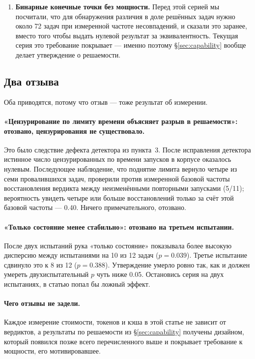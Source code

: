 \begin{enumerate}
\item \textbf{Бинарные конечные точки без мощности.} Перед этой серией мы
      посчитали, что для обнаружения различия в доле решённых задач нужно
      около 72 задач при измеренной частоте несовпадений, и сказали это
      заранее, вместо того чтобы выдать нулевой результат за
      эквивалентность. Текущая серия это требование покрывает — именно
      поэтому \S\ref{sec:capability} вообще делает утверждение о
      решаемости.
\end{enumerate}

\subsection{Два отзыва}

Оба приводятся, потому что отзыв — тоже результат об измерении.

\paragraph{«Цензурирование по лимиту времени объясняет разрыв в
решаемости»: отозвано, цензурирования не существовало.} Это было следствие
дефекта детектора из пункта~3. После исправления детектора истинное число
цензурированных по времени запусков в корпусе оказалось нулевым. Последующее
наблюдение, что поднятие лимита вернуло четыре из семи провалившихся задач,
проверили против измеренной базовой частоты восстановления вердикта между
неизменёнными повторными запусками (\num{5}/\num{11}); вероятность увидеть
четыре или больше восстановлений только за счёт этой базовой частоты —
\num{0.40}\live. Ничего примечательного, отозвано.

\paragraph{«Только состояние менее стабильно»: отозвано на третьем
испытании.} После двух испытаний рука «только состояние» показывала более
высокую дисперсию между испытаниями на 10 из 12 задач
($p={}$\num{0.039}). Третье испытание сдвинуло это к 8 из 12
($p={}$\num{0.388}). Утверждение умерло ровно так, как и должен умереть
двухиспытательный $p$ чуть ниже \num{0.05}. Остановись серия на двух
испытаниях, в статью попал бы ложный эффект.

\paragraph{Чего отзывы не задели.} Каждое измерение стоимости, токенов и
кэша в этой статье не зависит от вердиктов, а результаты по решаемости из
\S\ref{sec:capability} получены дизайном, который появился позже всего
перечисленного выше и покрывает требование к мощности, его мотивировавшее.

